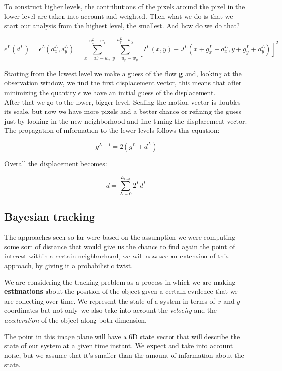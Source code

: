 To construct higher levels, the contributions of the pixels around the pixel in the lower level are taken into account and weighted. Then what we do is that we start our analysis from the highest level, the smallest. And how do we do that?

\[
\epsilon^L(d^L) = \epsilon^L(d^L_x, d^L_y) = \sum_{x=u^L_x-w_x}^{u^L_x+w_x} \sum_{y=u^L_y-w_y}^{u^L_y+w_y} \left[I^L(x, y) - J^L(x+ g^L_x +d^L_x, y+g^L_y+d^L_y)\right]^2
\]

Starting from the lowest level we make a guess of the flow \textbf{g} and, looking at the observation window, we find the first displacement vector, this means that after minimizing the quantity $\epsilon$ we have an initial guess of the displacement.
\\

After that we go to the lower, bigger level. Scaling the motion vector is doubles its scale, but now we have more pixels and a better chance or refining the guess just by looking in the new neighborhood and fine-tuning the displacement vector. The propagation of information to the lower levels follows this equation:

\[
    g^{L-1} = 2(g^L+d^L)
\]

Overall the displacement becomes:

\[
    d = \sum_{L=0}^{L_{max}} 2^Ld^L    
\]



\subsection{Bayesian tracking}

The approaches seen so far were based on the assumption we were computing some sort of distance that would give us the chance to find again the point of interest within a certain neighborhood, we will now see an extension of this approach, by giving it a probabilistic twist.

We are considering the tracking problem as a process in which we are making \textbf{estimations} about the position of the object given a certain evidence that we are collecting over time. We represent the state of a system in terms of $x$ and $y$ coordinates but not only, we also take into account the \textit{velocity} and the \textit{acceleration} of the object along both dimension.

The point in this image plane will have a 6D state vector that will describe the state of our system at a given time instant. We expect and take into account noise, but we assume that it's smaller than the amount of information about the state.

